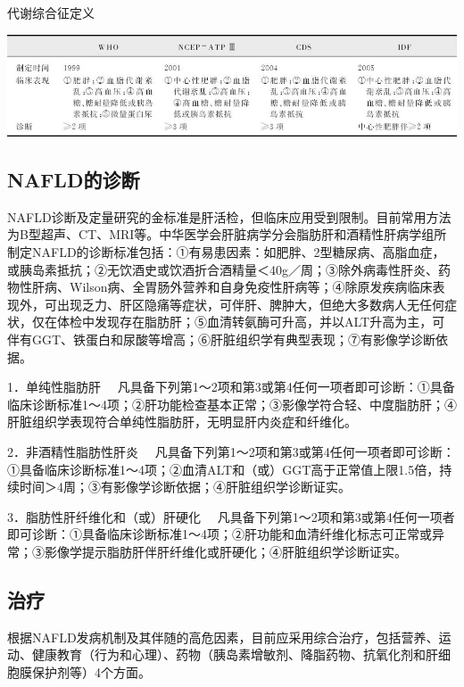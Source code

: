\begin{table}[htbp]
\centering
\caption{代谢综合征定义}
\label{tab3-26}
\includegraphics{./images/Image00043.jpg}
\end{table}

\hypertarget{text00004.htmlux5cux23mllj32}{%
\subsection{NAFLD的诊断}\label{text00004.htmlux5cux23mllj32}}

NAFLD诊断及定量研究的金标准是肝活检，但临床应用受到限制。目前常用方法为B型超声、CT、MRI等。中华医学会肝脏病学分会脂肪肝和酒精性肝病学组所制定NAFLD的诊断标准包括：①有易患因素：如肥胖、2型糖尿病、高脂血症，或胰岛素抵抗；②无饮酒史或饮酒折合酒精量＜40g／周；③除外病毒性肝炎、药物性肝病、Wilson病、全胃肠外营养和自身免疫性肝病等；④除原发疾病临床表现外，可出现乏力、肝区隐痛等症状，可伴肝、脾肿大，但绝大多数病人无任何症状，仅在体检中发现存在脂肪肝；⑤血清转氨酶可升高，并以ALT升高为主，可伴有GGT、铁蛋白和尿酸等增高；⑥肝脏组织学有典型表现；⑦有影像学诊断依据。

{1．单纯性脂肪肝}
　凡具备下列第1～2项和第3或第4任何一项者即可诊断：①具备临床诊断标准1～4项；②肝功能检查基本正常；③影像学符合轻、中度脂肪肝；④肝脏组织学表现符合单纯性脂肪肝，无明显肝内炎症和纤维化。

{2．非酒精性脂肪性肝炎}
　凡具备下列第1～2项和第3或第4任何一项者即可诊断：①具备临床诊断标准1～4项；②血清ALT和（或）GGT高于正常值上限1.5倍，持续时间＞4周；③有影像学诊断依据；④肝脏组织学诊断证实。

{3．脂肪性肝纤维化和（或）肝硬化}
　凡具备下列第1～2项和第3或第4任何一项者即可诊断：①具备临床诊断标准1～4项；②肝功能和血清纤维化标志可正常或异常；③影像学提示脂肪肝伴肝纤维化或肝硬化；④肝脏组织学诊断证实。

\hypertarget{text00004.htmlux5cux23mllj33}{%
\subsection{治疗}\label{text00004.htmlux5cux23mllj33}}

根据NAFLD发病机制及其伴随的高危因素，目前应采用综合治疗，包括营养、运动、健康教育（行为和心理）、药物（胰岛素增敏剂、降脂药物、抗氧化剂和肝细胞膜保护剂等）4个方面。

